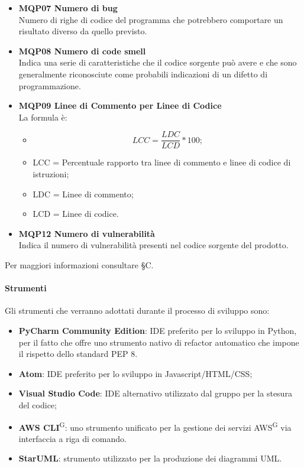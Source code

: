 \begin{itemize}
\item \textbf{MQP07 Numero di bug}\\
Numero di righe di codice del programma che potrebbero comportare un risultato diverso da quello previsto.

\item \textbf{MQP08 Numero di code smell}\\
Indica una serie di caratteristiche che il codice sorgente può avere e che sono generalmente riconosciute come probabili indicazioni di un difetto di programmazione.

\item \textbf{MQP09 Linee di Commento per Linee di Codice} \\
La formula è:
\begin{itemize}
  \item[] \[LCC = \frac{LDC}{LCD} * 100 ;\]
  \item LCC = Percentuale rapporto tra linee di commento e linee di codice di istruzioni;
  \item LDC = Linee di commento;
  \item LCD = Linee di codice.
  \end{itemize}


\item \textbf{MQP12 Numero di vulnerabilità}\\
Indica il numero di vulnerabilità presenti nel codice sorgente del prodotto.
\end{itemize}
Per maggiori informazioni consultare \S{}C.

\paragraph{Strumenti}
Gli strumenti che verranno adottati durante il processo di sviluppo sono:
\begin{itemize}
\item \textbf{PyCharm Community Edition}: IDE preferito per lo sviluppo in Python, per il fatto che offre uno strumento nativo di refactor automatico che impone il rispetto dello standard PEP 8.
\item \textbf{Atom}: IDE preferito per lo sviluppo in Javascript/HTML/CSS;
\item \textbf{Visual Studio Code}: IDE alternativo utilizzato dal gruppo per la stesura del codice;
\item \textbf{AWS CLI}\textsuperscript{G}: uno strumento unificato per la gestione dei servizi AWS\textsuperscript{G} via interfaccia a riga di comando.
\item \textbf{StarUML}: strumento utilizzato per la produzione dei diagrammi UML.

\end{itemize}

